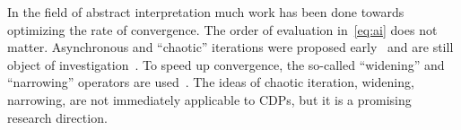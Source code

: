 In the field of abstract interpretation much work has been done towards optimizing the rate of convergence.
The order of evaluation in~\cref{eq:ai} does not matter.
Asynchronous and ``chaotic'' iterations were proposed early~\cite{cousot77asynchronous} and are still object of investigation~\cite{bourdoncleefficient}.
To speed up convergence, the so-called ``widening'' and ``narrowing'' operators are used~\cite{cortesi11widening}.
The ideas of chaotic iteration, widening, narrowing, are not immediately applicable to CDPs, but it is a promising research direction.

